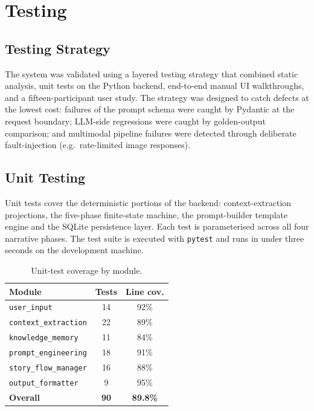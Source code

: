 \chapter{Testing}
\label{ch:testing}

\section{Testing Strategy}
The system was validated using a layered testing strategy that
combined static analysis, unit tests on the Python backend, end-to-end
manual UI walkthroughs, and a fifteen-participant user study. The
strategy was designed to catch defects at the lowest cost: failures
of the prompt schema were caught by Pydantic at the request boundary;
LLM-side regressions were caught by golden-output comparison; and
multimodal pipeline failures were detected through deliberate
fault-injection (e.g.\ rate-limited image responses).

\section{Unit Testing}
Unit tests cover the deterministic portions of the backend:
context-extraction projections, the five-phase finite-state machine,
the prompt-builder template engine and the SQLite persistence layer.
Each test is parameterised across all four narrative phases. The
test suite is executed with \texttt{pytest} and runs in under three
seconds on the development machine.

\begin{table}[!t]
\caption{Unit-test coverage by module.}
\label{tab:unittests}
\centering
\renewcommand{\arraystretch}{1.15}
\begin{tabular}{@{}lcc@{}}
\toprule
\textbf{Module}                & \textbf{Tests} & \textbf{Line cov.} \\
\midrule
\texttt{user\_input}            & 14 & 92\% \\
\texttt{context\_extraction}    & 22 & 89\% \\
\texttt{knowledge\_memory}      & 11 & 84\% \\
\texttt{prompt\_engineering}    & 18 & 91\% \\
\texttt{story\_flow\_manager}   & 16 & 88\% \\
\texttt{output\_formatter}      &  9 & 95\% \\
\midrule
\textbf{Overall}                & \textbf{90} & \textbf{89.8\%} \\
\bottomrule
\end{tabular}
\end{table}

